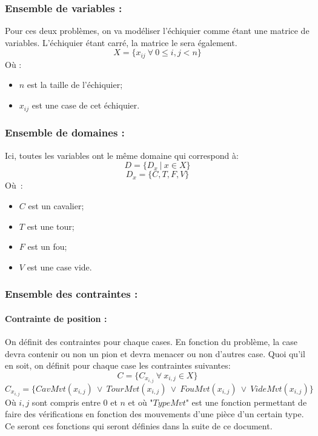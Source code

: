 \documentclass[a4paper,11pt]{article}
\newcommand{\OR}{~\vee~}
\begin{document}
        \subsubsection{Ensemble de variables :}
        	Pour ces deux problèmes, on va modéliser l'échiquier comme étant une matrice de variables. L'échiquier étant carré, la matrice le sera également.
        	\label{echec_variable}
        	$$X = \{x_{ij}~\forall~0 \leq i, j < n\}$$
            Où :
            \begin{itemize}
            	\item $n$ est la taille de l'échiquier;
                \item $x_{ij}$ est une case de cet échiquier.
            \end{itemize}
            
        \subsubsection{Ensemble de domaines :}
        	Ici, toutes les variables ont le même domaine qui correspond à:
        	\label{echec_domaine}
        	$$D = \{D_{x}~|~x \in X\}$$ 
            $$D_{x} = \{C, T, F, V\}$$
            Où~:
            \begin{itemize}
           		\item $C$ est un cavalier;
                \item $T$ est une tour;
                \item $F$ est un fou;
                \item $V$ est une case vide.
            \end{itemize}
        
        \subsubsection{Ensemble des contraintes :}
        	\paragraph{Contrainte de position :}
            	\label{contrainte_position}
        		On définit des contraintes pour chaque cases. En fonction du problème, la case devra contenir ou non un pion et devra menacer ou non d'autres case. Quoi qu'il en soit, on définit pour chaque case les contraintes suivantes:
        		\[C = \{C_{x_{i, j}}~\forall~x_{i, j} \in X\}\]
            	\[C_{x_{i, j}} = \{CavMvt(x_{i, j}) \OR TourMvt(x_{i, j}) \OR FouMvt(x_{i, j}) \OR VideMvt(x_{i, j})\}\]
            	Où $i, j$ sont compris entre $0$ et $n$ et où "$TypeMvt$" est une fonction permettant de faire des vérifications en fonction des mouvements d'une pièce d'un certain type.  Ce seront ces fonctions qui seront définies dans la suite de ce document.
        
\end{document}
